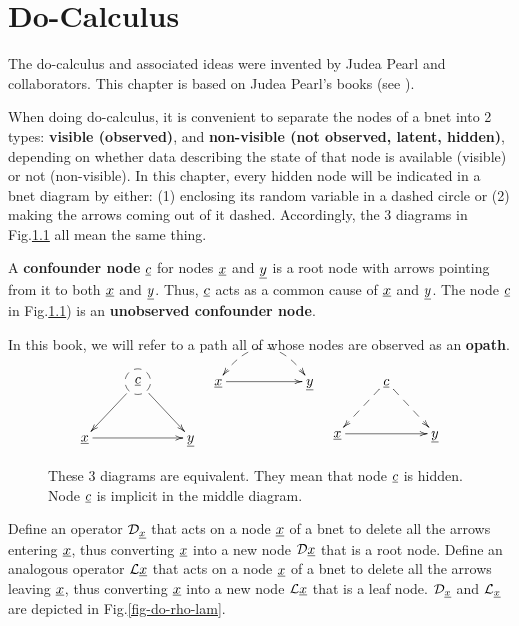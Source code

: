 \chapter{Do-Calculus}\label{ch-do-calc}


The do-calculus and associated ideas were
invented by
Judea Pearl and collaborators.
This chapter is 
based on Judea Pearl's
books (see ).


When
doing
do-calculus,
it is 
convenient
to separate
the nodes
of a bnet
into
2  types:
{\bf visible (observed)},
and {\bf non-visible (not observed, latent,
hidden)},
depending
on
whether data
describing
the
state 
of that
node
is available 
(visible) or not (non-visible).
In this chapter, every
hidden node will 
be indicated 
in a bnet
diagram by
either: (1)
enclosing
its random variable
in a dashed circle or
(2) making
the arrows
coming
out of it
dashed.
Accordingly, 
the 
3 diagrams 
in
Fig.\ref{fig-hidden-dashes}
all mean the same thing.

A {\bf confounder node} ${\underline{c}}$
for nodes ${\underline{x}}$ and ${\underline{y}}$
is a root node
with arrows
pointing
from it to
both
${\underline{x}}$ and ${\underline{y}}$.
Thus, ${\underline{c}}$ acts as a common cause
of ${\underline{x}}$ and ${\underline{y}}$.
The node
${\underline{c}}$
in Fig.\ref{fig-hidden-dashes})
is an {\bf unobserved confounder node}.

In this book,
we will refer
to a path
all of whose nodes are
observed as an {\bf opath}.



\begin{figure}[h!]
$$\xymatrix{
&*++[F-o]{\rvc}\ar[dl]\ar[dr]
\\
\rvx\ar[rr]&&\rvy
}
\;\;\;
\xymatrix{
\rvx\ar@{-->}@{<-->}@/^2pc/[rr]
\ar[rr]&&\rvy
}
\;\;\;
\xymatrix{
&\rvc\ar@{-->}[dl]\ar@{-->}[dr]
\\
\rvx\ar[rr]&&\rvy
}$$
\caption{
These 3 diagrams
are equivalent.
They
mean that node ${\underline{c}}$
is hidden.
Node ${\underline{c}}$
is implicit
in the
middle diagram.}
\label{fig-hidden-dashes}
\end{figure}



Define
an
operator
${\cal D}_{\underline{x}}$
that acts on
a node
${\underline{x}}$
of a bnet
to
delete
all
the 
arrows
entering
${\underline{x}}$,
thus
converting
${\underline{x}}$
into
a new
node ${\cal D} {\underline{x}}$
that
is a root node.
Define 
an analogous 
operator
${\cal L}{\underline{x}}$
that acts on
a node
${\underline{x}}$
of a bnet
to
delete
all
the 
arrows
leaving
${\underline{x}}$,
thus
converting
${\underline{x}}$
into
a new
node ${\cal L} {\underline{x}}$
that
is a leaf node.
${\cal D}_{\underline{x}}$
and
${\cal L}_{\underline{x}}$
are
depicted
in Fig.\ref{fig-do-rho-lam}.



